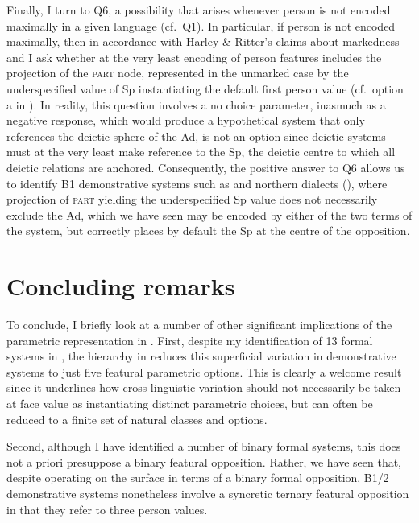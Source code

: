 \documentclass[output=paper]{langsci/langscibook}
\begin{document}
Finally, I turn to Q6, a possibility that arises whenever person is not encoded
maximally in a given language (cf.\ Q1). In particular, if person is not encoded
maximally, then in accordance with Harley \& Ritter’s claims about markedness
and  I ask whether at the very least encoding of person
features includes the projection of the \textsc{part} node, represented in the
unmarked case by the underspecified value of Sp instantiating the default first
person value (cf.\ option a in ). In reality, this question
involves a no choice parameter, inasmuch as a negative response, which would
produce a hypothetical system that only references the deictic sphere of the
Ad, is not an option since deictic systems must at the very least make
reference to the Sp, the deictic centre to which all deictic relations are
anchored. Consequently, the positive answer to Q6 allows us to identify
B1 demonstrative systems such as  and northern 
dialects (), where projection of
\textsc{part} yielding the underspecified Sp value does not necessarily exclude
the Ad, which we have seen may be encoded by either of the two terms of the
system, but correctly places by default the Sp at the centre of the opposition.

\section{Concluding remarks}

To conclude, I briefly look at a number of other significant implications of
the parametric representation in . First, despite my
identification of 13 formal systems in , the hierarchy in
 reduces this superficial variation in demonstrative systems
to just five featural parametric options. This is clearly a welcome result
since it underlines how cross-linguistic variation should not necessarily be
taken at face value as instantiating distinct parametric choices, but can often
be reduced to a finite set of natural classes and options.

Second, although I have identified a number of binary formal systems, this does
not a priori presuppose a binary featural opposition. Rather, we have
seen that, despite operating on the surface in terms of a binary formal
opposition, B1/2 demonstrative systems nonetheless involve a
syncretic ternary featural opposition in that they refer to three person
values.
\end{document}
